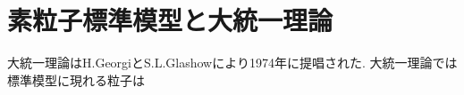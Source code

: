 \section{素粒子標準模型と大統一理論}
大統一理論はH.GeorgiとS.L.Glashowにより1974年に提唱された\cite{PhysRevLett.32.438}.
大統一理論では標準模型に現れる粒子は
